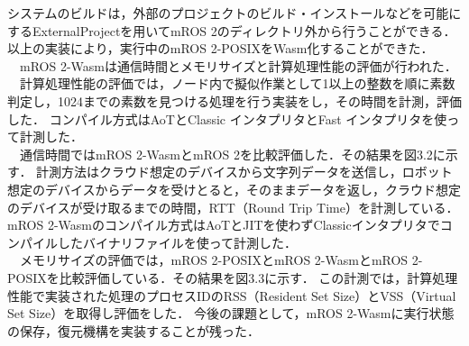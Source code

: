 システムのビルドは，外部のプロジェクトのビルド・インストールなどを可能にするExternalProjectを用いてmROS 2のディレクトリ外から行うことができる．
以上の実装により，実行中のmROS 2-POSIXをWasm化することができた．
\\　mROS 2-Wasmは通信時間とメモリサイズと計算処理性能の評価が行われた．
\\　計算処理性能の評価では，ノード内で擬似作業として1以上の整数を順に素数判定し，1024までの素数を見つける処理を行う実装をし，その時間を計測，評価した．
コンパイル方式はAoTとClassic インタプリタとFast インタプリタを使って計測した．
\\　通信時間ではmROS 2-WasmとmROS 2を比較評価した．その結果を図3.2に示す．
計測方法はクラウド想定のデバイスから文字列データを送信し，ロボット想定のデバイスからデータを受けとると，そのままデータを返し，クラウド想定のデバイスが受け取るまでの時間，RTT（Round Trip Time）を計測している．mROS 2-Wasmのコンパイル方式はAoTとJITを使わずClassicインタプリタでコンパイルしたバイナリファイルを使って計測した．
\\　メモリサイズの評価では，mROS 2-POSIXとmROS 2-WasmとmROS 2-POSIXを比較評価している．その結果を図3.3に示す．
この計測では，計算処理性能で実装された処理のプロセスIDのRSS（Resident Set Size）とVSS（Virtual Set Size）を取得し評価をした．
今後の課題として，mROS 2-Wasmに実行状態の保存，復元機構を実装することが残った．
